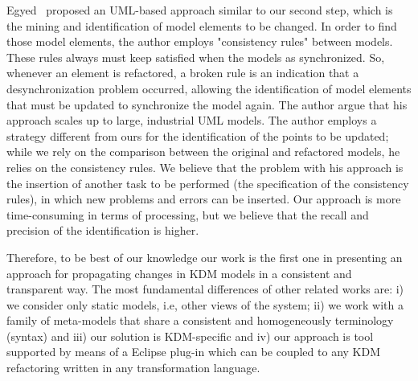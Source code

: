 Egyed~\cite{Egyed:2006:ICC:1134285.1134339} proposed an UML-based approach similar to our second step, which is the mining and identification of model elements to be changed. In order to find those model elements, the author employs "consistency rules" between models. These rules always must keep satisfied when the models as synchronized. So, whenever an element is refactored, a broken rule is an indication that a desynchronization problem occurred, allowing the identification of model elements that must be updated to synchronize the model again. The author argue that his approach scales up to large, industrial UML models. The author employs a strategy different from ours for the identification of the points to be updated; while we rely on the comparison between the original and refactored models, he relies on the consistency rules. We believe that the problem with his approach is the insertion of another task to be performed (the specification of the consistency rules), in which new problems and errors can be inserted. Our approach is more time-consuming in terms of processing, but we believe that the recall and precision of the identification is higher.

Therefore, to be best of our knowledge our work is the first one in presenting an approach for propagating changes in KDM models in a consistent and transparent way. The most fundamental differences of other related works are: i) we consider only static models, i.e, other views of the system; ii) we work with a family of meta-models that share a consistent and homogeneously terminology (syntax) and iii) our solution is KDM-specific and iv) our approach is tool supported by means of a Eclipse plug-in which can be coupled to any KDM refactoring written in any transformation language. 



